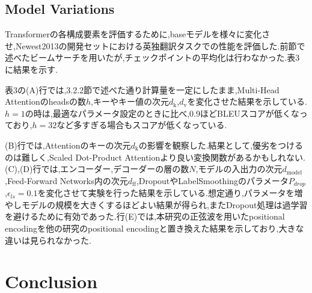 \documentclass{jarticle}     %
\begin{document}
\subsection{Model Variations}
Transformerの各構成要素を評価するために,baseモデルを様々に変化させ,Newest2013の開発セットにおける英独翻訳タスクでの性能を評価した.前節で述べたビームサーチを用いたが,チェックポイントの平均化は行わなかった.表3に結果を示す.



表3の(A)行では,3.2.2節で述べた通り計算量を一定にしたまま,Multi-Head Attentionのheadsの数$h$,キーやキー値の次元$d_\mathrm{k}$,$d_\mathrm{v}$を変化させた結果を示している.$h=1$の時は,最適なパラメータ設定のときに比べ,0.9ほどBLEUスコアが低くなっており,$h=32$など多すぎる場合もスコアが低くなっている.\par
(B)行では,Attentionのキーの次元$d_\mathrm{k}$の影響を観察した.結果として,優劣をつけるのは難しく,Scaled Dot-Product Attentionより良い変換関数があるかもしれない.(C),(D)行では,エンコーダー,デコーダーの層の数$N$,モデルの入出力の次元$d_\mathrm{model}$,Feed-Forward Networks内の次元$d_\mathrm{ff}$,DropoutやLabelSmoothingのパラメータ$P_{drop}$,$\epsilon_{ls} = 0.1$を変化させて実験を行った結果を示している.想定通り,パラメータを増やしモデルの規模を大きくするほどよい結果が得られ,またDropout処理は過学習を避けるために有効であった.行(E)では,本研究の正弦波を用いたpositional encodingを他の研究のpositional encodingと置き換えた結果を示しており,大きな違いは見られなかった.

\section{Conclusion}




\end{document}
